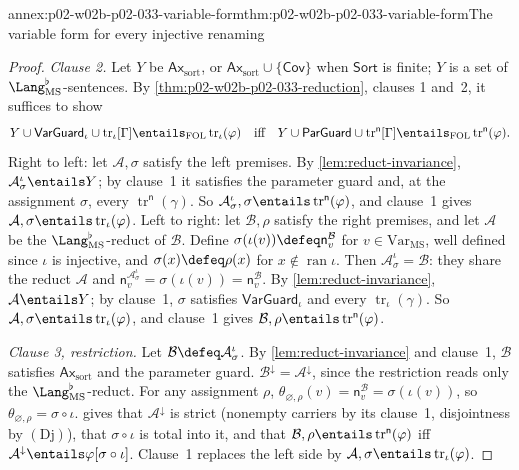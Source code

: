 \begin{annexitem}{annex:p02-w02b-p02-033-variable-form}{thm:p02-w02b-p02-033-variable-form}{The variable form for every injective renaming}
\begin{proof}
\emph{Clause 2.}  Let \(Y\) be \(\mathsf{Ax}_{\mathrm{sort}}\), or
\(\mathsf{Ax}_{\mathrm{sort}}\cup\{\mathsf{Cov}\}\) when \(\mathsf{Sort}\) is
finite; \(Y\) is a set of \(\Lang_{\mathrm{MS}}^{\flat}\)-sentences.  By
\cref{thm:p02-w02b-p02-033-reduction}, clauses 1 and~2, it suffices to show
\[
 Y\cup\mathsf{VarGuard}_{\iota}\cup\operatorname{tr}_{\iota}[\Gamma]
 \entails_{\mathrm{FOL}}\operatorname{tr}_{\iota}(\varphi)
 \quad\text{iff}\quad
 Y\cup\mathsf{ParGuard}\cup\operatorname{tr}^{\mathsf n}[\Gamma]
 \entails_{\mathrm{FOL}}\operatorname{tr}^{\mathsf n}(\varphi).
\]
Right to left: let \(\mathcal A,\sigma\) satisfy the left premises.  By
\cref{lem:reduct-invariance}, \(\mathcal A_{\sigma}^{\iota}\entails Y\); by
clause~1 it satisfies the parameter guard and, at the assignment \(\sigma\),
every \(\operatorname{tr}^{\mathsf n}(\gamma)\).  So
\(\mathcal A_{\sigma}^{\iota},\sigma\entails
\operatorname{tr}^{\mathsf n}(\varphi)\), and clause~1 gives
\(\mathcal A,\sigma\entails\operatorname{tr}_{\iota}(\varphi)\).  Left to
right: let \(\mathcal B,\rho\) satisfy the right premises, and let
\(\mathcal A\) be the \(\Lang_{\mathrm{MS}}^{\flat}\)-reduct of
\(\mathcal B\).  Define \(\sigma(\iota(v))\defeq\mathsf n_v^{\mathcal B}\) for
\(v\in\mathrm{Var}_{\mathrm{MS}}\), well defined since \(\iota\) is injective,
and \(\sigma(x)\defeq\rho(x)\) for \(x\notin\operatorname{ran}\iota\).  Then
\(\mathcal A_{\sigma}^{\iota}=\mathcal B\): they share the reduct
\(\mathcal A\) and \(\mathsf n_v^{\mathcal A_{\sigma}^{\iota}}=
\sigma(\iota(v))=\mathsf n_v^{\mathcal B}\).  By \cref{lem:reduct-invariance},
\(\mathcal A\entails Y\); by clause~1, \(\sigma\) satisfies
\(\mathsf{VarGuard}_{\iota}\) and every \(\operatorname{tr}_{\iota}(\gamma)\).
So \(\mathcal A,\sigma\entails\operatorname{tr}_{\iota}(\varphi)\), and
clause~1 gives \(\mathcal B,\rho\entails\operatorname{tr}^{\mathsf n}(\varphi)\).

\emph{Clause 3, restriction.}  Let \(\mathcal B\defeq\mathcal A_{\sigma}^{\iota}\).
By \cref{lem:reduct-invariance} and clause~1, \(\mathcal B\) satisfies
\(\mathsf{Ax}_{\mathrm{sort}}\) and the parameter guard.
\(\mathcal B^{\downarrow}=\mathcal A^{\downarrow}\), since the restriction
reads only the \(\Lang_{\mathrm{MS}}^{\flat}\)-reduct.  For any assignment
\(\rho\), \(\theta_{\varnothing,\rho}(v)=\mathsf n_v^{\mathcal B}=
\sigma(\iota(v))\), so \(\theta_{\varnothing,\rho}=\sigma\circ\iota\).
 gives that \(\mathcal A^{\downarrow}\)
is strict (nonempty carriers by its clause~1, disjointness by
\((\mathrm{Dj})\)), that \(\sigma\circ\iota\) is total into it, and that
\(\mathcal B,\rho\entails\operatorname{tr}^{\mathsf n}(\varphi)\) iff
\(\mathcal A^{\downarrow}\entails\varphi[\sigma\circ\iota]\).  Clause~1
replaces the left side by \(\mathcal A,\sigma\entails
\operatorname{tr}_{\iota}(\varphi)\).


\end{proof}
\end{annexitem}
